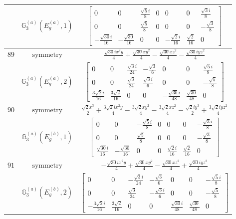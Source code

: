 \documentclass[fleqn,8pt,landscape]{jsarticle}
\begin{document}
\begin{longtable}{ccc}
$  $ & $ \mathbb{G}_{3}^{(a)}(E_{g}^{(a)},1) $ & $ \begin{bmatrix} 0 & 0 & \frac{\sqrt{5} i}{8} & 0 & 0 & 0 & \frac{\sqrt{3} i}{8} \\ 0 & 0 & \frac{\sqrt{5}}{8} & 0 & 0 & 0 & - \frac{\sqrt{3}}{8} \\ - \frac{\sqrt{30} i}{16} & - \frac{\sqrt{30}}{16} & 0 & 0 & - \frac{\sqrt{2} i}{16} & \frac{\sqrt{2}}{16} & 0 \end{bmatrix} $ \\ \hline
$ 89 $ & $ \text{symmetry} $ & $ \frac{\sqrt{30} i x^{2} y}{4} + \frac{\sqrt{30} x y^{2}}{4} - \frac{\sqrt{30} x z^{2}}{4} - \frac{\sqrt{30} i y z^{2}}{4} $ \\
$  $ & $ \mathbb{G}_{3}^{(a)}(E_{g}^{(a)},2) $ & $ \begin{bmatrix} 0 & 0 & \frac{\sqrt{3} i}{24} & - \frac{\sqrt{3}}{6} & 0 & 0 & \frac{\sqrt{5} i}{8} \\ 0 & 0 & \frac{\sqrt{3}}{24} & \frac{\sqrt{3} i}{6} & 0 & 0 & - \frac{\sqrt{5}}{8} \\ \frac{3 \sqrt{2} i}{16} & \frac{3 \sqrt{2}}{16} & 0 & 0 & - \frac{\sqrt{30} i}{48} & \frac{\sqrt{30}}{48} & 0 \end{bmatrix} $ \\ \hline
$ 90 $ & $ \text{symmetry} $ & $ \frac{\sqrt{2} x^{3}}{2} + \frac{3 \sqrt{2} i x^{2} y}{4} - \frac{3 \sqrt{2} x y^{2}}{4} - \frac{3 \sqrt{2} x z^{2}}{4} - \frac{\sqrt{2} i y^{3}}{2} + \frac{3 \sqrt{2} i y z^{2}}{4} $ \\
$  $ & $ \mathbb{G}_{3}^{(a)}(E_{g}^{(b)},1) $ & $ \begin{bmatrix} 0 & 0 & - \frac{\sqrt{5} i}{8} & 0 & 0 & 0 & - \frac{\sqrt{3} i}{8} \\ 0 & 0 & \frac{\sqrt{5}}{8} & 0 & 0 & 0 & - \frac{\sqrt{3}}{8} \\ \frac{\sqrt{30} i}{16} & - \frac{\sqrt{30}}{16} & 0 & 0 & \frac{\sqrt{2} i}{16} & \frac{\sqrt{2}}{16} & 0 \end{bmatrix} $ \\ \hline
$ 91 $ & $ \text{symmetry} $ & $ - \frac{\sqrt{30} i x^{2} y}{4} + \frac{\sqrt{30} x y^{2}}{4} - \frac{\sqrt{30} x z^{2}}{4} + \frac{\sqrt{30} i y z^{2}}{4} $ \\
$  $ & $ \mathbb{G}_{3}^{(a)}(E_{g}^{(b)},2) $ & $ \begin{bmatrix} 0 & 0 & - \frac{\sqrt{3} i}{24} & - \frac{\sqrt{3}}{6} & 0 & 0 & - \frac{\sqrt{5} i}{8} \\ 0 & 0 & \frac{\sqrt{3}}{24} & - \frac{\sqrt{3} i}{6} & 0 & 0 & - \frac{\sqrt{5}}{8} \\ - \frac{3 \sqrt{2} i}{16} & \frac{3 \sqrt{2}}{16} & 0 & 0 & \frac{\sqrt{30} i}{48} & \frac{\sqrt{30}}{48} & 0 \end{bmatrix} $ \\ \hline

\end{longtable}
\end{document}
